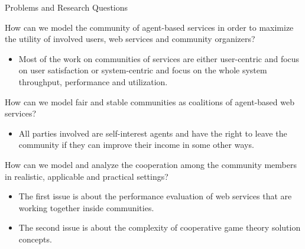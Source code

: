 \documentclass{beamer}
\begin{document}
\begin{frame}{Problems and Research Questions}


    \footnotesize{\colorbox{blue}{\color{white}{R1}} How can we model the community of agent-based services in order to maximize the utility
        of involved users, web services and community organizers?}\\
        \begin{itemize}
            \item Most of the work on communities of
            services are either user-centric and focus on user satisfaction
            or system-centric and focus on the whole system throughput, performance and utilization.
        \end{itemize}
    \vspace{0.3cm} \colorbox{blue}{\color{white}{R2}} How can we model fair and stable communities as coalitions of agent-based web services?\\
        \begin{itemize}
            \item All parties involved are self-interest agents and have the right to leave the community if they can improve their income in some other ways.
        \end{itemize}
    \vspace{0.3cm} \colorbox{blue}{\color{white}{R3}} How can we model and analyze the cooperation
        among the community members in realistic, applicable and practical settings?\\
        \begin{itemize}
            \item The first issue is about the performance evaluation of web services that are working together inside communities.
            \item The second issue is about the complexity of cooperative game theory solution concepts.
        \end{itemize}
\end{frame}
\end{document}
